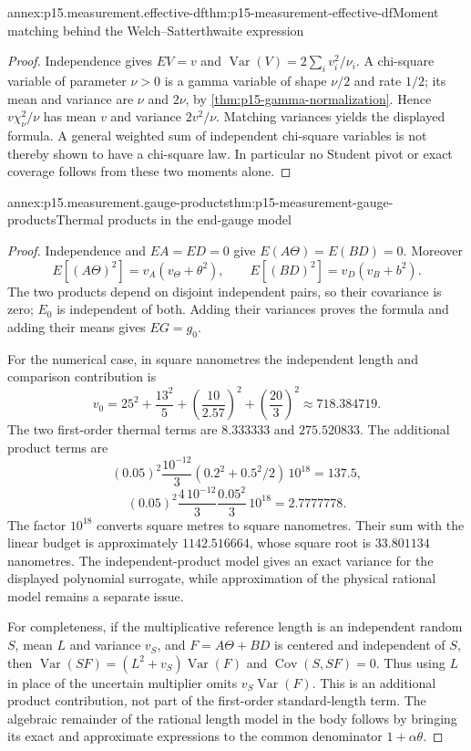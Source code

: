 \begin{annexitem}{annex:p15.measurement.effective-df}{thm:p15-measurement-effective-df}{Moment matching behind the Welch--Satterthwaite expression}
\begin{proof}
Independence gives \(EV=v\) and
\(\operatorname{Var}(V)=2\sum_i v_i^2/\nu_i\).
A chi-square variable of parameter \(\nu>0\) is a gamma variable of
shape \(\nu/2\) and rate \(1/2\); its mean and variance are
\(\nu\) and \(2\nu\), by
\cref{thm:p15-gamma-normalization}.
Hence \(v\chi_\nu^2/\nu\) has mean \(v\) and variance \(2v^2/\nu\).
Matching variances yields the displayed formula.
A general weighted sum of independent chi-square variables is not thereby
shown to have a chi-square law. In particular no Student pivot or exact
coverage follows from these two moments alone.
\end{proof}
\end{annexitem}

\begin{annexitem}{annex:p15.measurement.gauge-products}{thm:p15-measurement-gauge-products}{Thermal products in the end-gauge model}
\begin{proof}
Independence and \(EA=ED=0\) give \(E(A\Theta)=E(BD)=0\).
Moreover
\[
 E[(A\Theta)^2]=v_A(v_\Theta+\theta^2),\qquad
 E[(BD)^2]=v_D(v_B+b^2).
\]
The two products depend on disjoint independent pairs, so their covariance
is zero; \(E_0\) is independent of both. Adding their variances proves
the formula and adding their means gives \(EG=g_0\).

For the numerical case, in square nanometres the independent length and
comparison contribution is
\[
 v_0=25^2+\frac{13^2}{5}+\left(\frac{10}{2.57}\right)^2+
                 \left(\frac{20}{3}\right)^2
       \approx718.384719.
\]
The two first-order thermal terms are \(8.333333\) and \(275.520833\).
The additional product terms are
\[
 (0.05)^2\frac{10^{-12}}3(0.2^2+0.5^2/2)\,10^{18}=137.5,
\]
\[
 (0.05)^2\frac{4\,10^{-12}}3\frac{0.05^2}3\,10^{18}
 =2.7777778.
\]
The factor \(10^{18}\) converts square metres to square nanometres.
Their sum with the linear budget is approximately \(1142.516664\),
whose square root is \(33.801134\) nanometres.
The independent-product model gives an exact variance for the displayed
polynomial surrogate, while approximation of the physical rational model
remains a separate issue.

For completeness, if the multiplicative reference length is an independent
random \(S\), mean \(L\) and variance \(v_S\), and
\(F=A\Theta+BD\) is centered and independent of \(S\), then
\(\operatorname{Var}(SF)=(L^2+v_S)\operatorname{Var}(F)\) and
\(\operatorname{Cov}(S,SF)=0\).
Thus using \(L\) in place of the uncertain multiplier omits
\(v_S\operatorname{Var}(F)\). This is an additional product contribution,
not part of the first-order standard-length term.
The algebraic remainder of the rational length model in the body follows
by bringing its exact and approximate expressions to the common
denominator \(1+\alpha\theta\).
\end{proof}
\end{annexitem}

